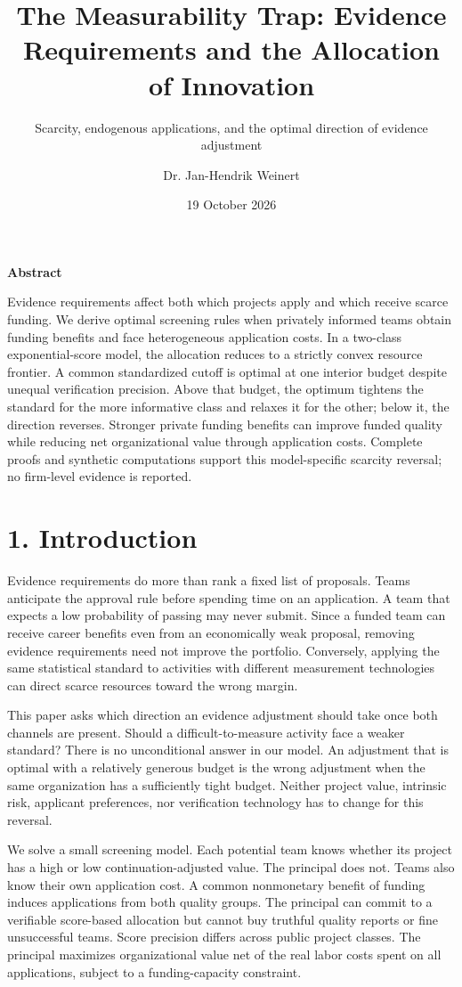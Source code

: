 \documentclass[
  11pt,
]{article}
\title{The Measurability Trap: Evidence Requirements and the Allocation
of Innovation}
\subtitle{Scarcity, endogenous applications, and the optimal direction
of evidence adjustment}
\author{Dr. Jan-Hendrik Weinert}
\date{19 October 2026}
\makeatletter
\renewcommand{\maketitle}{%
  \begin{center}
  {\LARGE\bfseries\@title\par}
  \vspace{0.8em}
  {\normalsize\@author\par}
  \vspace{0.35em}
  {\small\@date\par}
  \end{center}
  \vspace{0.4em}}
\renewenvironment{abstract}{%
  \begin{center}\small\bfseries Abstract\end{center}
  \begin{list}{}{\setlength{\leftmargin}{0.5in}\setlength{\rightmargin}{0.5in}}
  \item[]\small\setlength{\parindent}{0pt}\ignorespaces
}{\end{list}\vspace{0.6em}}
\makeatother
\begin{document}
\maketitle
\begin{abstract}
Evidence requirements affect both which projects apply and which receive scarce funding. We derive optimal screening rules when privately informed teams obtain funding benefits and face heterogeneous application costs. In a two-class exponential-score model, the allocation reduces to a strictly convex resource frontier. A common standardized cutoff is optimal at one interior budget despite unequal verification precision. Above that budget, the optimum tightens the standard for the more informative class and relaxes it for the other; below it, the direction reverses. Stronger private funding benefits can improve funded quality while reducing net organizational value through application costs. Complete proofs and synthetic computations support this model-specific scarcity reversal; no firm-level evidence is reported.
\end{abstract}
\section{1. Introduction}\label{introduction}

Evidence requirements do more than rank a fixed list of proposals. Teams
anticipate the approval rule before spending time on an application. A
team that expects a low probability of passing may never submit. Since a
funded team can receive career benefits even from an economically weak
proposal, removing evidence requirements need not improve the portfolio.
Conversely, applying the same statistical standard to activities with
different measurement technologies can direct scarce resources toward
the wrong margin.

This paper asks which direction an evidence adjustment should take once
both channels are present. Should a difficult-to-measure activity face a
weaker standard? There is no unconditional answer in our model. An
adjustment that is optimal with a relatively generous budget is the
wrong adjustment when the same organization has a sufficiently tight
budget. Neither project value, intrinsic risk, applicant preferences,
nor verification technology has to change for this reversal.

We solve a small screening model. Each potential team knows whether its
project has a high or low continuation-adjusted value. The principal
does not. Teams also know their own application cost. A common
nonmonetary benefit of funding induces applications from both quality
groups. The principal can commit to a verifiable score-based allocation
but cannot buy truthful quality reports or fine unsuccessful teams.
Score precision differs across public project classes. The principal
maximizes organizational value net of the real labor costs spent on all
applications, subject to a funding-capacity constraint.
\end{document}
